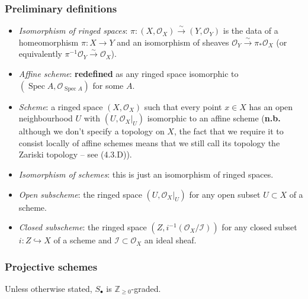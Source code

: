 \documentclass[10pt]{article}
\DeclareMathOperator{\Spec}{Spec}
\renewcommand{\O}{\mathcal{O}}
\newcommand{\Z}{\mathbb{Z}}
\newcommand{\congto}{\xrightarrow{\sim}}
\begin{document}
            \subsubsection{Preliminary definitions}\label{subsubsection:schemes-preliminary-definitions}
            
                \begin{itemize}
                    \item \textit{Isomorphism of ringed spaces}: $\pi\colon(X,\O_X)\congto(Y,\O_Y)$ is the data of a homeomorphism $\pi:X\to Y$ and an isomorphism of sheaves $\O_Y\congto\pi_*\O_X$ (or equivalently $\pi^{-1}\O_Y\congto\O_X$).
                    \item \textit{Affine scheme}: \textbf{redefined} as any ringed space isomorphic to $(\Spec A,\O_{\Spec A})$ for some $A$.
                    \item \textit{Scheme}: a ringed space $(X,\O_X)$ such that every point $x\in X$ has an open neighbourhood $U$ with $(U,\O_X|_U)$ isomorphic to an affine scheme (\textbf{n.b.} although we don't specify a topology on $X$, the fact that we require it to consist locally of affine schemes means that we still call its topology the Zariski topology – see (4.3.D)).
                    \item \textit{Isomorphism of schemes}: this is just an isomorphism of ringed spaces.
                    \item \textit{Open subscheme}: the ringed space $(U,\O_X|_U)$ for any open subset $U\subset X$ of a scheme.
                    \item \textit{Closed subscheme}: the ringed space $(Z,i^{-1}(\O_X/\mathcal{I}))$ for any closed subset $i\colon Z\hookrightarrow X$ of a scheme and $\mathcal{I}\subset\O_X$ an ideal sheaf.
                \end{itemize}
                
            \subsubsection{Projective schemes}
            
                Unless otherwise stated, $S_\bullet$ is $\Z_{\geqslant0}$-graded.
            
\end{document}
